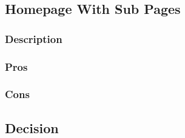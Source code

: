 \documentclass[onecolumn, draftclsnofoot,10pt, compsoc]{IEEEtran}
\begin{document}
\subsection{Homepage With Sub Pages}
\subsubsection*{Description}
\subsubsection*{Pros}
\subsubsection*{Cons}

\subsection{Decision}
\end{document}
